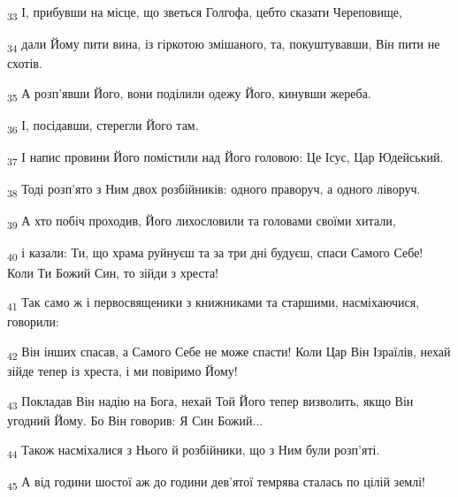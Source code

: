\begin{tcolorbox}
\textsubscript{33} І, прибувши на місце, що зветься Голгофа, цебто сказати Череповище,
\end{tcolorbox}
\begin{tcolorbox}
\textsubscript{34} дали Йому пити вина, із гіркотою змішаного, та, покуштувавши, Він пити не схотів.
\end{tcolorbox}
\begin{tcolorbox}
\textsubscript{35} А розп'явши Його, вони поділили одежу Його, кинувши жереба.
\end{tcolorbox}
\begin{tcolorbox}
\textsubscript{36} І, посідавши, стерегли Його там.
\end{tcolorbox}
\begin{tcolorbox}
\textsubscript{37} І напис провини Його помістили над Його головою: Це Ісус, Цар Юдейський.
\end{tcolorbox}
\begin{tcolorbox}
\textsubscript{38} Тоді розп'ято з Ним двох розбійників: одного праворуч, а одного ліворуч.
\end{tcolorbox}
\begin{tcolorbox}
\textsubscript{39} А хто побіч проходив, Його лихословили та головами своїми хитали,
\end{tcolorbox}
\begin{tcolorbox}
\textsubscript{40} і казали: Ти, що храма руйнуєш та за три дні будуєш, спаси Самого Себе! Коли Ти Божий Син, то зійди з хреста!
\end{tcolorbox}
\begin{tcolorbox}
\textsubscript{41} Так само ж і первосвященики з книжниками та старшими, насміхаючися, говорили:
\end{tcolorbox}
\begin{tcolorbox}
\textsubscript{42} Він інших спасав, а Самого Себе не може спасти! Коли Цар Він Ізраїлів, нехай зійде тепер із хреста, і ми повіримо Йому!
\end{tcolorbox}
\begin{tcolorbox}
\textsubscript{43} Покладав Він надію на Бога, нехай Той Його тепер визволить, якщо Він угодний Йому. Бо Він говорив: Я Син Божий...
\end{tcolorbox}
\begin{tcolorbox}
\textsubscript{44} Також насміхалися з Нього й розбійники, що з Ним були розп'яті.
\end{tcolorbox}
\begin{tcolorbox}
\textsubscript{45} А від години шостої аж до години дев'ятої темрява сталась по цілій землі!
\end{tcolorbox}

